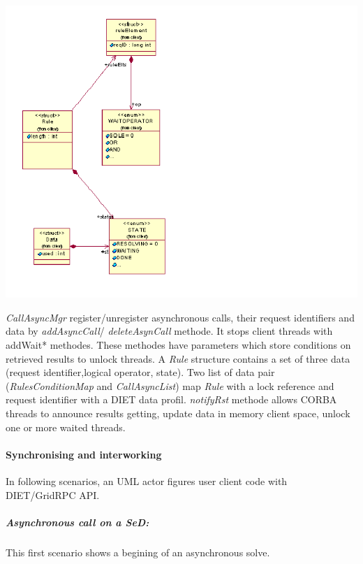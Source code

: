   \includegraphics{./fig/WaitRulesClassDiagram}

  \emph{CallAsyncMgr} register/unregister asynchronous calls, their request
  identifiers and data by \emph{addAsyncCall}/ \emph{deleteAsynCall} methode.
  It stops client threads with addWait* methodes. These methodes have
  parameters which store conditions on retrieved results to unlock threads.
  A \emph{Rule} structure contains a set of three data (request identifier,logical operator, state).
  Two list of data pair (\emph{RulesConditionMap} and \emph{CallAsyncList}) map \emph{Rule} with a
  lock reference and request identifier with a DIET data
  profil. \emph{notifyRst} methode allows CORBA threads to announce results getting,
  update data in memory client space, unlock one or more waited threads.

  \paragraph{Synchronising and interworking}
  In following scenarios, an UML actor figures user client code with DIET/GridRPC API.

  \subparagraph{Asynchronous call on a SeD:}
  This first scenario shows a begining of an asynchronous solve.

